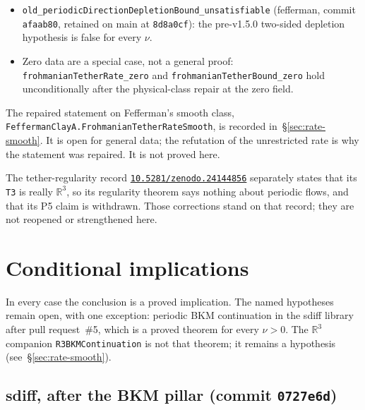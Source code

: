 \documentclass[11pt]{article}
\theoremstyle{plain}
\theoremstyle{definition}
\theoremstyle{remark}
\newcommand{\R}{\mathbb{R}}
\newcommand{\doi}[1]{\href{https://doi.org/#1}{\texttt{#1}}}
\newcommand{\sdiffsha}{0727e6d}
\newcommand{\fefsha}{8d8a0cf}
\begin{document}
{\begin{itemize}[leftmargin=1.4em]
\item \texttt{old\_\hspace{0pt}periodicDirectionDepletionBound\_\hspace{0pt}unsatisfiable} (fefferman, commit \texttt{afaab80}, retained on main at \texttt{\fefsha}): the pre-v1.5.0 two-sided depletion hypothesis is false for every \(\nu\).
\item Zero data are a special case, not a general proof: \texttt{frohmanianTetherRate\_zero} and \texttt{frohmanianTetherBound\_zero} hold unconditionally after the physical-class repair at the zero field.
\end{itemize}}
{\sloppy The repaired statement on Fefferman's smooth class, \texttt{FeffermanClayA.\allowbreak FrohmanianTether\allowbreak RateSmooth}, is recorded in~\S\ref{sec:rate-smooth}. It is open for general data; the refutation of the unrestricted rate is why the statement was repaired. It is not proved here.}

The tether-regularity record \doi{10.5281/zenodo.24144856} separately states that its \texttt{T3} is really \(\R^{3}\), so its regularity theorem says nothing about periodic flows, and that its P5 claim is withdrawn. Those corrections stand on that record; they are not reopened or strengthened here.

\section{Conditional implications}

In every case the conclusion is a proved implication. The named hypotheses remain open, with one exception: periodic BKM continuation in the sdiff library after pull request~\#5, which is a proved theorem for every \(\nu>0\). The \(\R^{3}\) companion \texttt{R3BKMContinuation} is not that theorem; it remains a hypothesis (see~\S\ref{sec:rate-smooth}).

\subsection{sdiff, after the BKM pillar (commit \texttt{\sdiffsha})}
\end{document}
